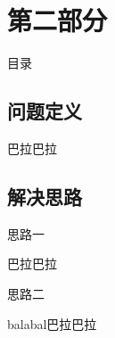 \section{第二部分}
\begin{frame}[noframenumbering]{目录}
\end{frame}

\subsection{问题定义}
\begin{frame}{\insertsection}
	\begin{defi}
		巴拉巴拉
	\end{defi}
\end{frame}
\subsection{解决思路}
\begin{frame}{\insertsection}
	\begin{solu}
		思路一
	\end{solu}
	\vspace{1.4cm}
	巴拉巴拉
\end{frame}

\begin{frame}{\insertsection}	
	\setcounter{solu}{1}
	\begin{solu}
		思路二
	\end{solu}
	\vspace{1.4cm}
	balabal巴拉巴拉
\end{frame}
